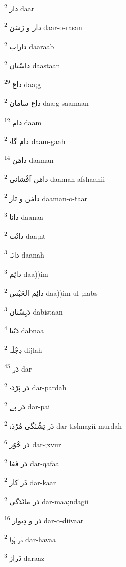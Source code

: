 \documentclass[12pt]{article}
\begin{document}
\begin{RTL}
\begin{multicols}{5}
{\ur دار}   \textsuperscript{2} daar

{\ur دار و رَسَن}   \textsuperscript{2} daar-o-rasan

{\ur داراب}   \textsuperscript{2} daaraab

{\ur داسْتان}   \textsuperscript{2} daastaan

{\ur داغ}   \textsuperscript{29} daa;g

{\ur داغ سامان}   \textsuperscript{2} daa;g-saamaan

{\ur دام}   \textsuperscript{12} daam

{\ur دام گاہ}   \textsuperscript{2} daam-gaah

{\ur دامَن}   \textsuperscript{14} daaman

{\ur دامَن اَفْشانی}   \textsuperscript{2} daaman-afshaanii

{\ur دامَن و تار}   \textsuperscript{2} daaman-o-taar

{\ur دانا}   \textsuperscript{3} daanaa

{\ur دانْت}   \textsuperscript{2} daa;nt

{\ur دانَہ}   \textsuperscript{3} daanah

{\ur دائِم}   \textsuperscript{3} daa))im

{\ur دائِم الحَبْس}   \textsuperscript{2} daa))im-ul-;habs

{\ur دَبِسْتان}   \textsuperscript{3} dabistaan

{\ur دَبْنا}   \textsuperscript{4} dabnaa

{\ur دِجْلَہ}   \textsuperscript{2} dijlah

{\ur دَر}   \textsuperscript{45} dar

{\ur دَر پَرْدَہ}   \textsuperscript{2} dar-pardah

{\ur دَر پے}   \textsuperscript{2} dar-pai

{\ur دَر تِشْنَگی مُرْدَہ}   \textsuperscript{2} dar-tishnagii-murdah

{\ur دَر خْوُر}   \textsuperscript{6} dar-;xvur

{\ur دَر قَفا}   \textsuperscript{2} dar-qafaa

{\ur دَر کار}   \textsuperscript{2} dar-kaar

{\ur دَر مانْدَگی}   \textsuperscript{2} dar-maa;ndagii

{\ur دَر و دِیوار}   \textsuperscript{16} dar-o-diivaar

{\ur دَر ہَوا}   \textsuperscript{2} dar-havaa

{\ur دَراز}   \textsuperscript{3} daraaz


\end{multicols}
\end{RTL}
\end{document}

